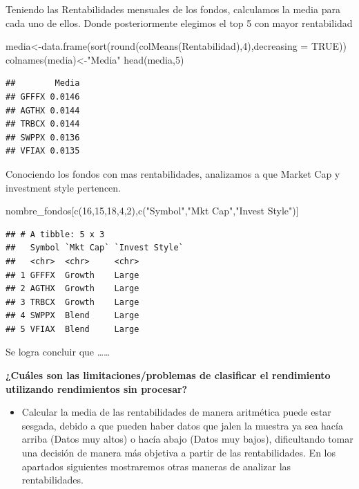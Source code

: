 \documentclass[
  12pt,
]{article}
\newenvironment{Shaded}{\begin{snugshade}}{\end{snugshade}}
\newcommand{\AttributeTok}[1]{\textcolor[rgb]{0.77,0.63,0.00}{#1}}
\newcommand{\ConstantTok}[1]{\textcolor[rgb]{0.00,0.00,0.00}{#1}}
\newcommand{\DecValTok}[1]{\textcolor[rgb]{0.00,0.00,0.81}{#1}}
\newcommand{\FunctionTok}[1]{\textcolor[rgb]{0.00,0.00,0.00}{#1}}
\newcommand{\NormalTok}[1]{#1}
\newcommand{\OtherTok}[1]{\textcolor[rgb]{0.56,0.35,0.01}{#1}}
\newcommand{\StringTok}[1]{\textcolor[rgb]{0.31,0.60,0.02}{#1}}
\providecommand{\tightlist}{%
  \setlength{\itemsep}{0pt}\setlength{\parskip}{0pt}}
\begin{document}
Teniendo las Rentabilidades mensuales de los fondos, calculamos la media
para cada uno de ellos. Donde posteriormente elegimos el top 5 con mayor
rentabilidad

\begin{Shaded}
\begin{Highlighting}[]
\NormalTok{media}\OtherTok{\textless{}{-}}\FunctionTok{data.frame}\NormalTok{(}\FunctionTok{sort}\NormalTok{(}\FunctionTok{round}\NormalTok{(}\FunctionTok{colMeans}\NormalTok{(Rentabilidad),}\DecValTok{4}\NormalTok{),}\AttributeTok{decreasing =} \ConstantTok{TRUE}\NormalTok{))}
\FunctionTok{colnames}\NormalTok{(media)}\OtherTok{\textless{}{-}}\StringTok{"Media"}
\FunctionTok{head}\NormalTok{(media,}\DecValTok{5}\NormalTok{)}
\end{Highlighting}
\end{Shaded}

\begin{verbatim}
##        Media
## GFFFX 0.0146
## AGTHX 0.0144
## TRBCX 0.0144
## SWPPX 0.0136
## VFIAX 0.0135
\end{verbatim}

Conociendo los fondos con mas rentabilidades, analizamos a que Market
Cap y investment style pertencen.

\begin{Shaded}
\begin{Highlighting}[]
\NormalTok{nombre\_fondos[}\FunctionTok{c}\NormalTok{(}\DecValTok{16}\NormalTok{,}\DecValTok{15}\NormalTok{,}\DecValTok{18}\NormalTok{,}\DecValTok{4}\NormalTok{,}\DecValTok{2}\NormalTok{),}\FunctionTok{c}\NormalTok{(}\StringTok{"Symbol"}\NormalTok{,}\StringTok{"Mkt Cap"}\NormalTok{,}\StringTok{"Invest Style"}\NormalTok{)]}
\end{Highlighting}
\end{Shaded}

\begin{verbatim}
## # A tibble: 5 x 3
##   Symbol `Mkt Cap` `Invest Style`
##   <chr>  <chr>     <chr>         
## 1 GFFFX  Growth    Large         
## 2 AGTHX  Growth    Large         
## 3 TRBCX  Growth    Large         
## 4 SWPPX  Blend     Large         
## 5 VFIAX  Blend     Large
\end{verbatim}

Se logra concluir que \ldots\ldots{}

\textbf{¿Cuáles son las limitaciones/problemas de clasificar el
rendimiento utilizando rendimientos sin procesar?}

\begin{itemize}
\tightlist
\item
  Calcular la media de las rentabilidades de manera aritmética puede
  estar sesgada, debido a que pueden haber datos que jalen la muestra ya
  sea hacía arriba (Datos muy altos) o hacía abajo (Datos muy bajos),
  dificultando tomar una decisión de manera más objetiva a partir de las
  rentabilidades. En los apartados siguientes mostraremos otras maneras
  de analizar las rentabilidades.
\end{itemize}
\end{document}
